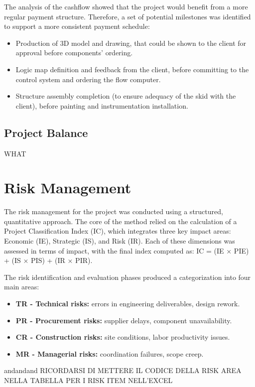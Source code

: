 The analysis of the cashflow showed that the project would benefit from a more regular payment structure. Therefore, a set of potential milestones was identified to support a more consistent payment schedule:
\begin{itemize}
    \item Production of 3D model and drawing, that could be shown to the client for approval before components' ordering.
    \item Logic map definition and feedback from the client, before committing to the control system and ordering the flow computer.
    \item Structure assembly completion (to ensure adequacy of the skid with the client), before painting and instrumentation installation.
\end{itemize}

\subsection{Project Balance}
WHAT

\section{Risk Management}

The risk management for the project was conducted using a structured, quantitative approach. The core of the method relied on the calculation of a Project Classification Index (IC), which integrates three key impact areas: Economic (IE), Strategic (IS), and Risk (IR). Each of these dimensions was assessed in terms of impact, with the final index computed as:
IC = (IE × PIE) + (IS × PIS) + (IR × PIR).

The risk identification and evaluation phases produced a categorization into four main areas:
\begin{itemize}
    \item \textbf{TR - Technical risks:} errors in engineering deliverables, design rework.
    \item \textbf{PR - Procurement risks:} supplier delays, component unavailability.
    \item \textbf{CR - Construction risks:} site conditions, labor productivity issues.
    \item \textbf{MR - Managerial risks:} coordination failures, scope creep.
\end{itemize}

andandand RICORDARSI DI METTERE IL CODICE DELLA RISK AREA NELLA TABELLA PER I RISK ITEM NELL'EXCEL

